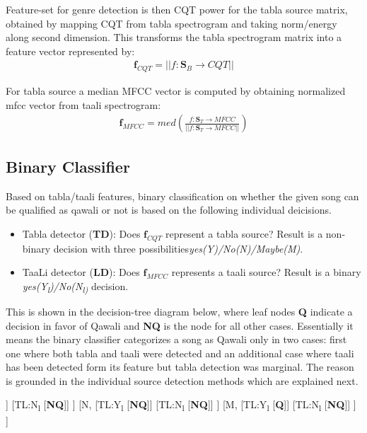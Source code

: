 \documentclass{article}
\begin{document}
Feature-set for genre detection is then CQT power for the tabla source matrix, obtained by mapping CQT from tabla spectrogram and taking norm/energy along second dimension. This transforms the tabla spectrogram matrix into a feature vector represented by:
\begin{align}\label{eq:eq6}
\boldsymbol{f}_{CQT} = \lvert \lvert f\colon \boldsymbol{S}_{B}\to CQT \rvert \rvert
\end{align}

For tabla source a median MFCC vector is computed by obtaining normalized mfcc vector from taali spectrogram:
\begin{align}\label{eq:eq7}
\boldsymbol{f}_{MFCC} = med(\frac{f\colon \boldsymbol{S}_{T}\to MFCC}{\lvert \lvert {f\colon \boldsymbol{S}_{T}\to MFCC} \rvert \rvert})
\end{align}

\subsection{Binary Classifier}
Based on tabla/taali features, binary classification on whether the given song can be qualified as qawali or not is based on the following individual deicisions.
\begin{itemize}
	\item Tabla detector (\textbf{TD}): Does $\boldsymbol{f}_{CQT}$ represent a tabla source? Result is a non-binary decision with three possibilities\textit{yes(Y)/No(N)/Maybe(M)}.
	\item TaaLi detector (\textbf{LD}): Does $\boldsymbol{f}_{MFCC}$ represents a taali source? Result is a binary \textit{yes(Y\textsubscript{l})/No(N\textsubscript{l)}} decision.
\end{itemize}
This is shown in the decision-tree diagram below, where leaf nodes \textbf{Q} indicate a decision in favor of Qawali and \textbf{NQ} is the node for all other cases. Essentially it means the binary classifier categorizes a song as Qawali only in two cases: first one where both tabla and taali were detected and an additional case where taali has been detected form its feature but tabla detection was marginal. The reason is grounded in the individual source detection methods which are explained next.

\begin{forest}
[TD,
	[Y,
		[TL:Y\textsubscript{l}
			[\textbf{Q}]]
		[TL:N\textsubscript{l}
			[\textbf{NQ}]]
	]
	[N,
		[TL:Y\textsubscript{l}
			[\textbf{NQ}]]
		[TL:N\textsubscript{l}
			[\textbf{NQ}]]
	]
	[M,
		[TL:Y\textsubscript{l}
			[\textbf{Q}]]
		[TL:N\textsubscript{l}
			[\textbf{NQ}]]
	]
]
\end{forest}
\end{document}
